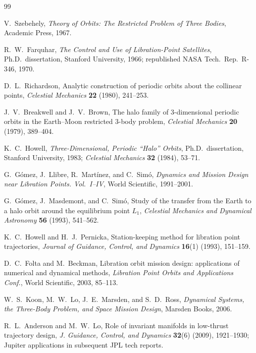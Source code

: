\documentclass[11pt,a4paper]{article}
\begin{document}
\begin{thebibliography}{99}

V.~Szebehely, \textit{Theory of Orbits: The Restricted Problem of Three Bodies}, Academic Press, 1967.

R.~W.~Farquhar, \textit{The Control and Use of Libration-Point Satellites}, Ph.D.\ dissertation, Stanford University, 1966; republished NASA Tech.\ Rep.\ R-346, 1970.

D.~L.~Richardson, Analytic construction of periodic orbits about the collinear points, \textit{Celestial Mechanics} \textbf{22} (1980), 241--253.

J.~V.~Breakwell and J.~V.~Brown, The halo family of 3-dimensional periodic orbits in the Earth--Moon restricted 3-body problem, \textit{Celestial Mechanics} \textbf{20} (1979), 389--404.

K.~C.~Howell, \textit{Three-Dimensional, Periodic ``Halo'' Orbits}, Ph.D.\ dissertation, Stanford University, 1983; \textit{Celestial Mechanics} \textbf{32} (1984), 53--71.

G.~G\'omez, J.~Llibre, R.~Mart\'inez, and C.~Sim\'o, \textit{Dynamics and Mission Design near Libration Points. Vol.~I--IV}, World Scientific, 1991--2001.

G.~G\'omez, J.~Masdemont, and C.~Sim\'o, Study of the transfer from the Earth to a halo orbit around the equilibrium point $L_1$, \textit{Celestial Mechanics and Dynamical Astronomy} \textbf{56} (1993), 541--562.

K.~C.~Howell and H.~J.~Pernicka, Station-keeping method for libration point trajectories, \textit{Journal of Guidance, Control, and Dynamics} \textbf{16}(1) (1993), 151--159.

D.~C.~Folta and M.~Beckman, Libration orbit mission design: applications of numerical and dynamical methods, \textit{Libration Point Orbits and Applications Conf.}, World Scientific, 2003, 85--113.

W.~S.~Koon, M.~W.~Lo, J.~E.~Marsden, and S.~D.~Ross, \textit{Dynamical Systems, the Three-Body Problem, and Space Mission Design}, Marsden Books, 2006.

R.~L.~Anderson and M.~W.~Lo, Role of invariant manifolds in low-thrust trajectory design, \textit{J. Guidance, Control, and Dynamics} \textbf{32}(6) (2009), 1921--1930; Jupiter applications in subsequent JPL tech reports.


\end{thebibliography}
\end{document}
